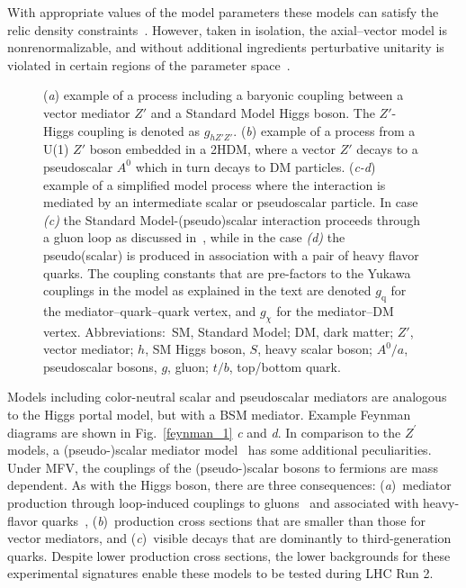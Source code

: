 \documentclass{ar-1col}
\newcommand{\chiDM}{\ensuremath{\chi}\xspace}
\newcommand{\gDM}{\ensuremath{g_{\chiDM}}\xspace}
\newcommand{\gdm}{\gDM}
\newcommand{\gq}{$g_{\mathrm{q}}$\xspace}
\newcommand{\ghZprimeZprime}{\ensuremath{g_{hZ'Z'}}\xspace}
\newcommand{\Zprime}{\ensuremath{{Z}^\prime}\xspace}
\begin{document}
With appropriate values of the model parameters 
these models can satisfy the relic density
constraints~\cite{Chala:2015ama}. However, taken in isolation,
the axial--vector model is nonrenormalizable, and without additional ingredients 
perturbative unitarity is violated in certain regions of the
parameter space~\cite{Chala:2015ama,Kahlhoefer:2015bea,Boveia:2016mrp}.

\begin{figure}[!htpb]
\caption{
(\textit{a}) example of a process including a baryonic coupling between a vector mediator $Z'$ and a Standard Model Higgs boson. The $Z'$-Higgs coupling is denoted as \ghZprimeZprime. 
(\textit{b}) example of a process from a U(1) $Z'$ boson embedded in a 2HDM, where a vector $Z'$ decays to a pseudoscalar $A^0$ which in turn decays to DM particles. 
(\textit{c-d}) example of a simplified model process where the interaction is mediated by an intermediate scalar or pseudoscalar particle. In case \textit{(c)} the Standard Model-(pseudo)scalar interaction proceeds through a gluon loop as discussed in~\cite{Haisch:2013ata}, while in the case \textit{(d)} the pseudo(scalar) is produced in association with a pair of heavy flavor quarks. The coupling constants that are pre-factors to the Yukawa couplings in the model as explained in the text are denoted \gq for the mediator--quark--quark vertex, and \gdm for the mediator--DM vertex. 
Abbreviations:\ SM, Standard Model; DM, dark matter; $Z'$, vector mediator; $h$, SM Higgs boson, $S$, heavy scalar boson; $A^0/a$, pseudoscalar bosons, $g$, gluon; $t/b$, top/bottom quark. }
\label{fig:feynman_1}
\end{figure}

Models including {color-neutral scalar and pseudoscalar mediators} are analogous
to the Higgs portal model, but with a BSM mediator. Example Feynman diagrams are  
shown in Fig.~\ref{feynman_1} \textit{c} and \textit{d}. In comparison to the \Zprime
models, a (pseudo-)scalar mediator
model~\cite{Buckley:2014fba} has some additional peculiarities.
Under MFV, the couplings of the (pseudo-)scalar bosons to fermions
are mass dependent. As with the Higgs boson, there are three
consequences: (\textit{a})\ mediator production through loop-induced
couplings to gluons~\cite{Haisch:2015ioa} and associated with
heavy-flavor quarks~\cite{Buckley:2014fba}, (\textit{b})\ production
cross sections that are smaller than those for vector mediators, and (\textit{c})\ visible
decays that are dominantly to third-generation quarks.
Despite lower production cross sections, the lower backgrounds for these
experimental signatures enable these models to be tested during
LHC Run 2.
\end{document}

